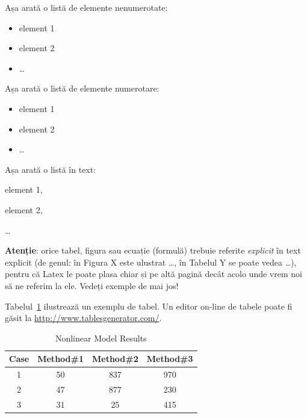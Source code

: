 Așa arată o listă de elemente nenumerotate:
\begin{itemize}
  \item element 1
  \item element 2
  \item \dots
\end{itemize}


Așa arată o listă de elemente numerotare:
\begin{itemize}
  \item element 1
  \item element 2
  \item \dots
\end{itemize}


Așa arată o listă în text: 
\begin{inparaenum}[(\itshape 1 \upshape)]
  \item element 1, 
  \item element 2, 
  \item \dots
\end{inparaenum}

\textbf{Atenție}: orice tabel, figura sau ecuație (formulă) trebuie referite \textit{explicit} în text explicit (de genul: în Figura X este ulustrat \dots, în Tabelul Y se poate vedea \dots), pentru că Latex le poate plasa chiar și pe altă pagină decât acolo unde vrem noi să ne referim la ele. Vedeți exemple de mai jos!

Tabelul~\ref{table:example} ilustrează un exemplu de tabel. Un editor on-line de tabele poate fi găsit la \url{http://www.tablesgenerator.com/}. 

\begin{table}[t]
\centering                          %
\begin{tabular}{|c|c|c|c|}          %
\hline\hline                        %
Case & Method\#1 & Method\#2 & Method\#3 \\ [0.5ex]   %
\hline                              %
1 & 50 & 837 & 970 \\               %
2 & 47 & 877 & 230 \\
3 & 31 & 25 & 415 \\[1ex]           %
\hline                              
\end{tabular}
\caption{Nonlinear Model Results}   %
\label{table:example}                %
\end{table}

